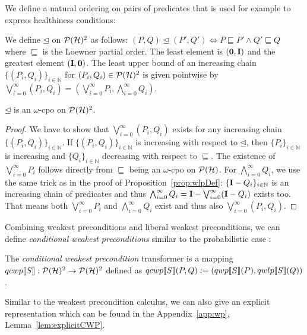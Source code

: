 \documentclass[a4paper,UKenglish,cleveref, autoref, thm-restate]{lipics-v2021}
\begin{document}
We define a natural ordering on pairs of predicates that is used for example to express healthiness conditions:
\begin{definition}
We define $\unlhd$ on $\mathcal{P}(\mathcal{H})^2$ as follows: $
    (P,Q) \unlhd (P',Q') \Leftrightarrow P \sqsubseteq P' \land Q' \sqsubseteq Q$
where $\sqsubseteq$ is the Loewner partial order. The least element is $(\mathbf{0},\textbf{I})$ and the greatest element $(\textbf{I},\mathbf{0})$.
The least upper bound of an increasing chain $\{(P_i,Q_i)\}_{i\in \mathbb{N}}$ for $(P_i,Q_i)\in \mathcal{P}(\mathcal{H})^2$ is given pointwise by
$\bigvee_{i=0}^\infty (P_i,Q_i) = (\bigvee_{i=0}^\infty P_i ,\bigwedge_{i=0}^\infty Q_i)$.
\end{definition}
\begin{lemma}
    $\unlhd$ is an $\omega$-cpo on $\mathcal{P}(\mathcal{H})^2$.
\end{lemma}
\begin{proof}
    We have to show that $\bigvee_{i=0}^\infty (P_i,Q_i)$ exists for any increasing chain $\{(P_i,Q_i)\}_{i\in \mathbb{N}}$.
    If $\{(P_i,Q_i)\}_{i\in \mathbb{N}}$ is increasing with respect to $\unlhd$, then $\{P_i\}_{i\in \mathbb{N}}$ is increasing and $\{Q_i\}_{i\in \mathbb{N}}$ decreasing with respect to $\sqsubseteq$. The existence of $\bigvee_{i=0}^\infty P_i $ follows directly from $\sqsubseteq$ being an $\omega$-cpo on $\mathcal{P}(\mathcal{H})$. For $\bigwedge_{i=0}^\infty Q_i$, we use the same trick as in the proof of Proposition~\ref{prop:wlpDef}: $\{\textbf{I} - Q_i\}_{i\in \mathbb{N}}$ is an increasing chain of predicates and thus $ \bigwedge_{i=0}^\infty Q_i = \textbf{I} - \bigvee_{i=0}^\infty (\textbf{I} - Q_i)$ exists too. That means both $\bigvee_{i=0}^\infty P_i $ and $\bigwedge_{i=0}^\infty Q_i $ exist and thus also $\bigvee_{i=0}^\infty (P_i,Q_i)$.
\end{proof}
Combining weakest preconditions and liberal weakest preconditions, we can define \emph{conditional weakest preconditions} similar to the probabilistic case \cite{conditioningProb}:
\begin{definition}
    \label{def:qcwp}
    The \emph{conditional weakest precondition} transformer is a mapping $qcwp\llbracket S \rrbracket: \mathcal{P}(\mathcal{H})^2\to \mathcal{P}(\mathcal{H})^2$ defined as $
    qcwp\llbracket S \rrbracket (P,Q) := (qwp\llbracket S \rrbracket (P), qwlp\llbracket S \rrbracket (Q))$.
\end{definition}
Similar to the weakest precondition calculus, we can also give an explicit representation which can be found in the Appendix~\ref{app:wp}, Lemma~\ref{lem:explicitCWP}.
\end{document}
